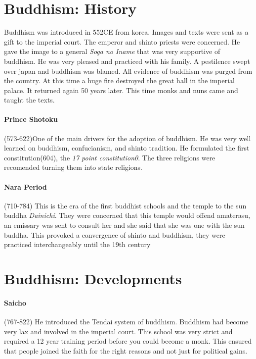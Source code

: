 \documentclass{article}
\begin{document}
\section*{Buddhism: History}
\label{sec:buddhism_history}
Buddhism was introduced in 552CE from korea. Images and texts were sent as a gift to the imperial court. The emperor and shinto priests were concerned. He gave the image to a general \emph{Soga no Iname} that was very supportive of buddhism. He was very pleased and practiced with his family. A pestilence swept over japan and buddhism was blamed. All evidence of buddhism was purged from the country. At this time a huge fire destroyed the great hall in the imperial palace. It returned again 50 years later. This time monks and nuns came and taught the texts.

\paragraph{Prince Shotoku}
\label{par:prince_shotoku}
(573-622)One of the main drivers for the adoption of buddhism. He was very well learned on buddhism, confucianism, and shinto tradition. He formulated the first constitution(604), the \emph{17 point constitution0}. The three religions were recomended turning them into state religions.

\paragraph{Nara Period}
\label{par:nara_period}
(710-784) This is the era of the first buddhist schools and the temple to the sun buddha \emph{Dainichi}. They were concerned that this temple would offend amaterasu, an emissary was sent to consult her and she said that she was one with the sun buddha. This provoked a convergence of shinto and buddhism, they were practiced interchangeably until the 19th century

\section*{Buddhism: Developments}
\label{sec:buddhism_developments}
\paragraph{Saicho}
\label{par:saicho}
(767-822) He introduced the Tendai system of buddhism. Buddhism had become very lax and involved in the imperial court. This school was very strict and required a 12 year training period before you could become a monk. This ensured that people joined the faith for the right reasons and not just for political gains.
\end{document}
